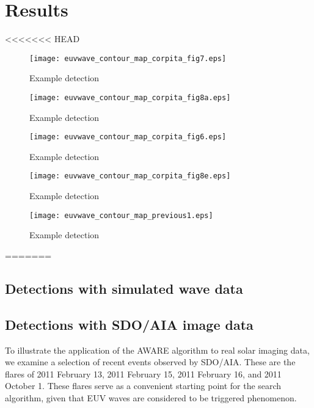 \section{Results}\label{sec:results}

<<<<<<< HEAD
\begin{figure}
\begin{center}
\texttt{[image: euvwave\_contour\_map\_corpita\_fig7.eps]}
\caption{Example detection}
\label{corpita_fig7}
\end{center}
\end{figure}

\begin{figure}
\begin{center}
\texttt{[image: euvwave\_contour\_map\_corpita\_fig8a.eps]}
\caption{Example detection}
\label{corpita_fig8a}
\end{center}
\end{figure}

\begin{figure}
\begin{center}
\texttt{[image: euvwave\_contour\_map\_corpita\_fig6.eps]}
\caption{Example detection}
\label{corpita_fig6}
\end{center}
\end{figure}

\begin{figure}
\begin{center}
\texttt{[image: euvwave\_contour\_map\_corpita\_fig8e.eps]}
\caption{Example detection}
\label{corpita_fig8e}
\end{center}
\end{figure}

\begin{figure}
\begin{center}
\texttt{[image: euvwave\_contour\_map\_previous1.eps]}
\caption{Example detection}
\label{previous1}
\end{center}
\end{figure}
=======
\subsection{Detections with simulated wave data}

\subsection{Detections with SDO/AIA image data}

To illustrate the application of the AWARE algorithm to real solar imaging data, we examine a selection of recent events observed by SDO/AIA. These are the flares of 2011 February 13, 2011 February 15, 2011 February 16, and 2011 October 1. These flares serve as a convenient starting point for the search algorithm, given that EUV waves are considered to be triggered phenomenon. 

